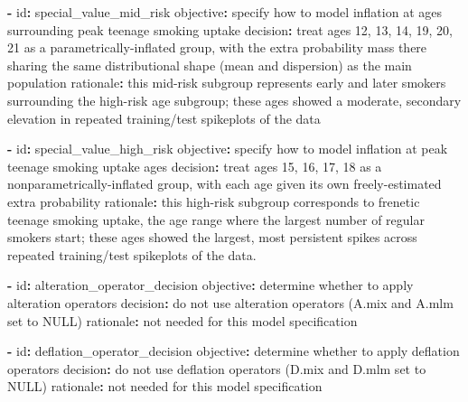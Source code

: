 \documentclass[aoas]{imsart}
\makeatletter
\newenvironment{Shaded}{\begin{snugshade}}{\end{snugshade}}
\newcommand{\AttributeTok}[1]{\textcolor[rgb]{0.40,0.45,0.13}{#1}}
\newcommand{\FunctionTok}[1]{\textcolor[rgb]{0.28,0.35,0.67}{#1}}
\newcommand{\KeywordTok}[1]{\textcolor[rgb]{0.00,0.23,0.31}{\textbf{#1}}}
\renewenvironment{Shaded}{}{}
\renewenvironment{codelisting}{%
    \def\@captype{codelisting}%
    \par\addvspace{0.5em}\noindent
  }{%
    \par\addvspace{0.5em}%
  }%
\makeatother
\begin{document}
\begin{codelisting}
{\begin{Shaded}
\begin{Highlighting}[]
\KeywordTok{{-}}\AttributeTok{ }\FunctionTok{id}\KeywordTok{:}\AttributeTok{ special\_value\_mid\_risk}
\AttributeTok{  }\FunctionTok{objective}\KeywordTok{:}\AttributeTok{ specify how to model inflation at ages surrounding peak teenage smoking uptake}
\AttributeTok{  }\FunctionTok{decision}\KeywordTok{:}\AttributeTok{ treat ages 12, 13, 14, 19, 20, 21 as a parametrically{-}inflated group, with the extra probability mass there sharing the same distributional shape (mean and dispersion) as the main population }
\AttributeTok{  }\FunctionTok{rationale}\KeywordTok{:}\AttributeTok{ this mid{-}risk subgroup represents early and later smokers surrounding the high{-}risk age subgroup; these ages showed a moderate, secondary elevation in repeated training/test spikeplots of the data}

\KeywordTok{{-}}\AttributeTok{ }\FunctionTok{id}\KeywordTok{:}\AttributeTok{ special\_value\_high\_risk}
\AttributeTok{  }\FunctionTok{objective}\KeywordTok{:}\AttributeTok{ specify how to model inflation at peak teenage smoking uptake ages}
\AttributeTok{  }\FunctionTok{decision}\KeywordTok{:}\AttributeTok{ treat ages 15, 16, 17, 18 as a nonparametrically{-}inflated group, with each age given its own freely{-}estimated extra probability }
\AttributeTok{  }\FunctionTok{rationale}\KeywordTok{:}\AttributeTok{ this high{-}risk subgroup corresponds to frenetic teenage smoking uptake, the age range where the largest number of regular smokers start; these ages showed the largest, most persistent spikes across repeated training/test spikeplots of the data.}

\KeywordTok{{-}}\AttributeTok{ }\FunctionTok{id}\KeywordTok{:}\AttributeTok{ alteration\_operator\_decision}
\AttributeTok{  }\FunctionTok{objective}\KeywordTok{:}\AttributeTok{ determine whether to apply alteration operators}
\AttributeTok{  }\FunctionTok{decision}\KeywordTok{:}\AttributeTok{ do not use alteration operators (A.mix and A.mlm set to NULL)}
\AttributeTok{  }\FunctionTok{rationale}\KeywordTok{:}\AttributeTok{ not needed for this model specification}

\KeywordTok{{-}}\AttributeTok{ }\FunctionTok{id}\KeywordTok{:}\AttributeTok{ deflation\_operator\_decision}
\AttributeTok{  }\FunctionTok{objective}\KeywordTok{:}\AttributeTok{ determine whether to apply deflation operators}
\AttributeTok{  }\FunctionTok{decision}\KeywordTok{:}\AttributeTok{ do not use deflation operators (D.mix and D.mlm set to NULL)}
\AttributeTok{  }\FunctionTok{rationale}\KeywordTok{:}\AttributeTok{ not needed for this model specification}


\end{Highlighting}
\end{Shaded}}
\end{codelisting}
\end{document}
